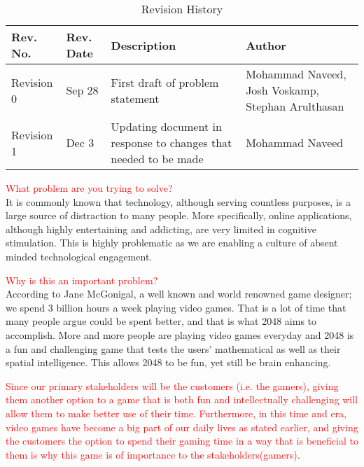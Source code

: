 \documentclass[12pt]{article}
\begin{document}
\begin{titlepage}
		
		
		
		\vfill %
		
\end{titlepage}
\begin{table}[!htbp]
	\color{red}
	\centering
	\begin{tabular}{ | p{2cm} | p{2cm}| p{6cm} | p{3cm}|}
		\hline
		Rev. No. & Rev. Date & Description & Author \\\hline
		Revision 0 & Sep 28 & First draft of problem statement & Mohammad Naveed, Josh Voskamp, Stephan Arulthasan \\\hline
		Revision 1 & Dec 3 & Updating document in response to changes that needed to be made & Mohammad Naveed \\\hline
	\end{tabular}
	\caption{Revision History}
\end{table}
\newpage

\textcolor{red}{What problem are you trying to solve?}\\
It is commonly known that technology, although serving countless purposes, is a large source of distraction to many people. More specifically, online applications, although highly entertaining and addicting, are very limited in cognitive stimulation. This is highly problematic as we are enabling a culture of absent minded technological engagement. \par \vspace{5mm}

\textcolor{red}{Why is this an important problem?}\\
According to Jane McGonigal, a well known and world renowned game designer; we spend 3 billion hours a week playing video games. That is a lot of time that many people argue could be spent better, and that is what 2048 aims to accomplish. More and more people are playing video games everyday and 2048 is a fun and challenging game that tests the users' mathematical as well as their spatial intelligence. This allows 2048 to be fun, yet still be brain enhancing. \par \textcolor{red}{Since our primary stakeholders will be the customers (i.e. the gamers), giving them another option to a game that is both fun and intellectually challenging will allow them to make better use of their time. Furthermore, in this time and era, video games have become a big part of our daily lives as stated earlier, and giving the customers the option to spend their gaming time in a way that is beneficial to them is why this game is of importance to the stakeholders(gamers). } \par \vspace{5mm}
\end{document}
